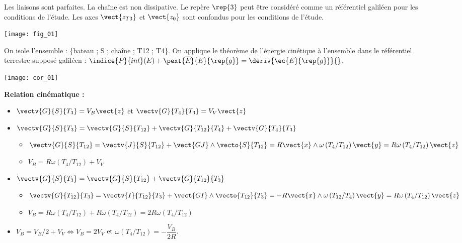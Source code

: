 \begin{multicols}{2}
Les liaisons sont parfaites. La chaîne est non dissipative. Le repère $\rep{3}$ peut être considéré comme un référentiel galiléen pour les conditions de l’étude. Les axes $\vect{z_{T3}}$ et $\vect{z_{0}}$ sont confondus pour les conditions de l’étude.

\begin{center}
\texttt{[image: fig\_01]}
\end{center}

\fi

\ifprof
\begin{corrige}
On isole l'ensemble : \{bateau ; S ; chaîne ; T12 ; T4\}. On applique le théorème de l'énergie cinétique à l’ensemble dans le référentiel terrestre supposé galiléen : 
$\indice{P}{int}(E)+ \pext{\overline{E}}{E}{\rep{g}} = \deriv{\ec{E}{\rep{g}}}{}$.

\begin{center}
\texttt{[image: cor\_01]}
\end{center} 


\textbf{Relation cinématique :}


\begin{itemize}
	\item $\vectv{G}{S}{T_3}=V_B \vect{z}$ et $\vectv{G}{T_4}{T_{3}}=V_V \vect{z}$
	\item $\vectv{G}{S}{T_3}=\vectv{G}{S}{T_{12}}+\vectv{G}{T_{12}}{T_{4}}+\vectv{G}{T_4}{T_{3}}$
	\begin{itemize}
	\item $\vectv{G}{S}{T_{12}}=\vectv{J}{S}{T_{12}}+\vect{GJ}\wedge\vecto{S}{T_{12}}=R\vect{x}\wedge \omega\left({T_{4}}/{T_{12}}\right) \vect{y}=R\omega\left({T_{4}}/{T_{12}}\right) \vect{z}$
	\item $V_B=R\omega\left({T_{4}}/{T_{12}}\right)+V_V$
	\end{itemize}
	\item $\vectv{G}{S}{T_3}=\vectv{G}{S}{T_{12}}+\vectv{G}{T_{12}}{T_{3}}$
	\begin{itemize}
	\item $\vectv{G}{T_{12}}{T_{3}}=\vectv{I}{T_{12}}{T_{3}}+\vect{GI}\wedge\vecto{T_{12}}{T_{3}}=-R\vect{x}\wedge \omega\left({T_{12}}/{T_{4}}\right)\vect{y}=R\omega\left({T_{4}}/{T_{12}}\right) \vect{z}$
	\item $V_B=R\omega\left({T_{4}}/{T_{12}}\right)+R\omega\left({T_{4}}/{T_{12}}\right)=2R\omega\left({T_{4}}/{T_{12}}\right)$
\end{itemize}
\item $V_B=V_B/2+V_V\Longleftrightarrow V_B=2V_V$ et $\omega\left({T_{4}}/{T_{12}}\right)=-\dfrac{V_B}{2R}$.	 
\end{itemize}


\end{corrige}
\end{multicols}
